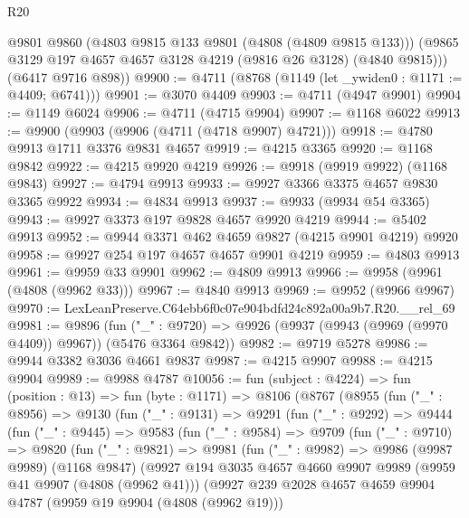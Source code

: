 \begin{lexlean}{R20}
\begin{coremodule}
        @9801
        @9860
        (@4803 @9815 @133 @9801 (@4808 (@4809 @9815 @133)))
        (@9865 @3129 @197 @4657 @4657 @3128 @4219 (@9816 @26 @3128) (@4840 @9815)))
      (@6417 @9716 @898))
@9900 := @4711 (@8768 (@1149 (let _ywiden0 : @1171 := @4409; @6741)))
@9901 := @3070 @4409
@9903 := @4711 (@4947 @9901)
@9904 := @1149 @6024
@9906 := @4711 (@4715 @9904)
@9907 := @1168 @6022
@9913 := @9900 (@9903 (@9906 (@4711 (@4718 @9907) @4721)))
@9918 := @4780 @9913 @1711 @3376 @9831 @4657
@9919 := @4215 @3365
@9920 := @1168 @9842
@9922 := @4215 @9920 @4219
@9926 := @9918 (@9919 @9922) (@1168 @9843)
@9927 := @4794 @9913
@9933 := @9927 @3366 @3375 @4657 @9830 @3365 @9922
@9934 := @4834 @9913
@9937 := @9933 (@9934 @54 @3365)
@9943 := @9927 @3373 @197 @9828 @4657 @9920 @4219
@9944 := @5402 @9913
@9952 := @9944 @3371 @462 @4659 @9827 (@4215 @9901 @4219) @9920
@9958 := @9927 @254 @197 @4657 @4657 @9901 @4219
@9959 := @4803 @9913
@9961 := @9959 @33 @9901
@9962 := @4809 @9913
@9966 := @9958 (@9961 (@4808 (@9962 @33)))
@9967 := @4840 @9913
@9969 := @9952 (@9966 @9967)
@9970 := LexLeanPreserve.C64ebb6f0c07e904bdfd24c892a00a9b7.R20.__rel_69
@9981 := @9896
    (fun ("_" : @9720) => @9926 (@9937 (@9943 (@9969 (@9970 @4409)) @9967)) (@5476 @3364 @9842))
@9982 := @9719 @5278
@9986 := @9944 @3382 @3036 @4661 @9837
@9987 := @4215 @9907
@9988 := @4215 @9904
@9989 := @9988 @4787
@10056 := fun (subject : @4224) =>
  fun (position : @13) =>
  fun (byte : @1171) =>
  @8106
    (@8767
      (@8955
        (fun ("_" : @8956) =>
        @9130
          (fun ("_" : @9131) =>
          @9291
            (fun ("_" : @9292) =>
            @9444
              (fun ("_" : @9445) =>
              @9583
                (fun ("_" : @9584) =>
                @9709
                  (fun ("_" : @9710) =>
                  @9820
                    (fun ("_" : @9821) =>
                    @9981
                      (fun ("_" : @9982) =>
                      @9986
                        (@9987 @9989)
                        (@1168 @9847)
                        (@9927
                          @194
                          @3035
                          @4657
                          @4660
                          @9907
                          @9989
                          (@9959 @41 @9907 (@4808 (@9962 @41)))
                          (@9927
                            @239
                            @2028
                            @4657
                            @4659
                            @9904
                            @4787
                            (@9959 @19 @9904 (@4808 (@9962 @19)))

\end{coremodule}
\end{lexlean}

